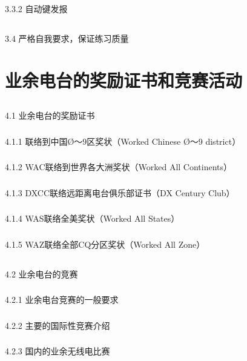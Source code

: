 \documentclass[12pt,UTF8]{ctexbook}
\begin{document}
\subsection{}3.3.2 自动键发报
\section{}3.4 严格自我要求，保证练习质量

\chapter{业余电台的奖励证书和竞赛活动}

\section{}4.1 业余电台的奖励证书
\subsection{}4.1.1 联络到中国Ø～9区奖状（Worked Chinese Ø～9 district）
\subsection{}4.1.2 WAC联络到世界各大洲奖状（Worked All Continents）
\subsection{}4.1.3 DXCC联络远距离电台俱乐部证书（DX Century Club）
\subsection{}4.1.4 WAS联络全美奖状（Worked All States）
\subsection{}4.1.5 WAZ联络全部CQ分区奖状（Worked All Zone）
\section{}4.2 业余电台的竞赛
\subsection{}4.2.1 业余电台竞赛的一般要求
\subsection{}4.2.2 主要的国际性竞赛介绍
\subsection{}4.2.3 国内的业余无线电比赛
\end{document}
